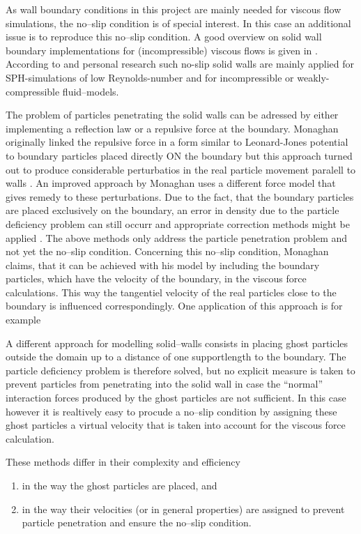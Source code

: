 \documentclass{report}
\begin{document}
As wall boundary conditions in this project are mainly needed for viscous flow simulations, the no--slip condition is of special interest. In this case an additional issue is to reproduce this no--slip condition. A good overview on solid wall boundary implementations for (incompressible) viscous flows is given in \cite{Yildiz2009}. 
According to \cite{Yildiz2009} and personal research such no-slip solid walls are mainly applied for SPH-simulations of low Reynolds-number and for incompressible or weakly-compressible fluid--models. 

The problem of particles penetrating the solid walls can be adressed by either implementing a reflection law or a repulsive force at the boundary. Monaghan originally linked the repulsive force in a form similar to Leonard-Jones potential to boundary particles placed directly ON the boundary \cite{Monaghan1994} but this approach turned out to produce considerable perturbatios in the real particle movement paralell to walls \cite{Monaghan2005}. An improved approach by Monaghan uses a different force model \cite{Monaghan2004} that gives remedy to these perturbations. Due to the fact, that the boundary particles are placed exclusively on the boundary, an error in density due to the particle deficiency problem can still occurr and appropriate correction methods might be applied \cite{Monaghan2004}. The above methods only address the particle penetration problem and not yet the no--slip condition. Concerning this no--slip condition, Monaghan claims, that it can be achieved with his model by including the boundary particles, which have the velocity of the boundary, in the viscous force calculations. This way the tangentiel velocity of the real particles close to the boundary is influenced correspondingly. One application of this approach is for example \cite{Cleary2002} 

A different approach for modelling solid--walls consists in placing ghost particles outside the domain up to a distance of one supportlength to the boundary. The particle deficiency problem is therefore solved, but no explicit measure is taken to prevent particles from penetrating into the solid wall in case the ``normal'' interaction forces produced by the ghost particles are not sufficient. In this case however it is realtively easy to procude a no--slip condition by assigning these ghost particles a virtual velocity that is taken into account for the viscous force calculation.

 These methods differ in their complexity and efficiency 
\begin{enumerate}
  \item in the way the ghost particles are placed, and
\item in the way their velocities (or in general properties) are assigned to prevent particle penetration and ensure the no--slip condition.
 \end{enumerate}
\end{document}
